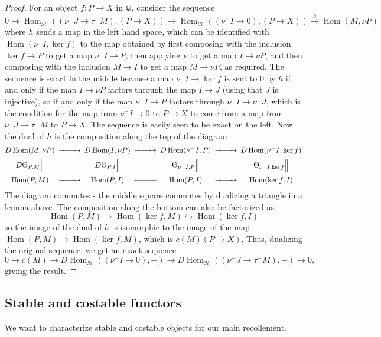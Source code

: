 \documentclass[11pt,a4paper]{amsart}
\theoremstyle{plain}
\theoremstyle{definition}
\begin{document}
\begin{proof}
For an object $f\colon P\to X$ in ${\mathcal{Q}}$, consider the sequence
\[
0
\to
\operatorname{Hom}_{\mathcal{H}}((\nu^- J\to\tau^- M),(P\to X))
\to
\operatorname{Hom}_{\mathcal{H}}((\nu^- I\to 0),(P\to X))
\xrightarrow{h}
\operatorname{Hom}(M,\nu P)
\]
where $h$ sends a map in the left hand space, which can be identified with $\operatorname{Hom}(\nu^- I,\operatorname{ker} f)$
to the map obtained by first composing with the inclusion $\operatorname{ker} f\to P$ to get a map $\nu^-I\to P$,
then applying $\nu$ to get a map $I \to \nu P$, and then composing with the inclusion $M\to I$
to get a map $M\to \nu P$, as required.
The sequence is exact in the middle because a map $\nu^- I\to \operatorname{ker} f$ is sent to 0 by $h$
if and only if the map $I\to \nu P$ factors through the map $I\to J$ (using that $J$ is injective),
so if and only if the map $\nu^- I\to P$ factors through $\nu^- I \to \nu^- J$,
which is the condition for the map 
from $\nu^- I\to 0$ to $P\to X$ to come from a map from
$\nu^- J\to\tau^- M$ to $P\to X$.
The sequence is easily seen to be exact on the left.
Now the dual of $h$ is the composition along the top of the diagram
\[
\begin{CD}
D\operatorname{Hom}(M,\nu P) @>>> D\operatorname{Hom}(I,\nu P) @>>> D\operatorname{Hom}(\nu^- I,P) @>>> D\operatorname{Hom}(\nu^- I,\operatorname{ker} f) 
\\
D\Theta_{P,M} @| 
D\Theta_{P,I} @| 
\Theta_{\nu^- I,P} @| 
\Theta_{\nu^- I,\operatorname{ker} f} @|
\\
\operatorname{Hom}(P,M) @>>> \operatorname{Hom}(P,I) @= \operatorname{Hom}(P,I) @>>> \operatorname{Hom}(\operatorname{ker} f,I) 
\end{CD}
\]
The diagram commutes - the middle square commutes by dualizing a triangle in a lemma above.
The composition along the bottom can also be factorized as
\[
\operatorname{Hom}(P,M)\to \operatorname{Hom}(\operatorname{ker} f,M) \hookrightarrow \operatorname{Hom}(\operatorname{ker} f,I)
\]
so the image of the dual of $h$ is isomorphic to the image of the map
$\operatorname{Hom}(P,M)\to \operatorname{Hom}(\operatorname{ker} f,M)$, which is $c(M)(P\to X)$.
Thus, dualizing the original sequence, we get an exact sequence
\[
0 \to c(M)
\to
D\operatorname{Hom}_{\mathcal{H}}((\nu^- I\to 0),-)
\to
D\operatorname{Hom}_{\mathcal{H}}((\nu^- J\to\tau^- M),-)
\to
0,
\]
giving the result.
\end{proof}

\subsection*{Stable and costable functors}
We want to characterize stable and costable objects for our main recollement. 
\end{document}
